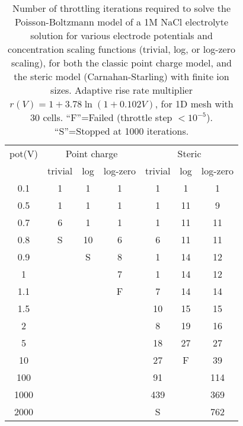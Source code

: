 \begin{table}
  \centering
  \begin{tabular}{c|ccc|ccc}
pot(V)  & \multicolumn{3}{c|}{Point charge} & \multicolumn{3}{c}{Steric}    \\
        & trivial & log & log-zero & trivial & log & log-zero \\ \hline
0.1	&1	&1	&1	&1	&1	&1\\
0.5	&1	&1	&1	&1	&11	&9\\
0.7	&6	&1	&1	&1	&11	&11\\
0.8	&S	&10	&6	&6	&11	&11\\
0.9	&	&S	&8	&1	&14	&12\\
1	&	&	&7	&1	&14	&12\\
1.1	&	&	&F	&7	&14	&14\\
1.5	&	&	&	&10	&15	&15\\
2	&	&	&	&8	&19	&16\\
5	&	&	&	&18	&27	&27\\
10	&	&	&	&27	&F	&39\\
100	&	&	&	&91	&	&114\\
1000	&	&	&	&439	&	&369    \\
2000	&	&	&	&S	&	&762    
  \end{tabular}
\caption{\label{tab:convergence}Number of throttling iterations
  required to  solve the Poisson-Boltzmann model of a 1M NaCl electrolyte solution
  for various electrode potentials and concentration scaling
  functions (trivial, log, or log-zero scaling), for both the classic point charge model, and the steric
  model (Carnahan-Starling) with finite ion sizes. Adaptive rise rate
  multiplier $r(V)=1+3.78\ln(1+0.102V)$, for 1D mesh with 30 cells. 
  ``F''=Failed
  (throttle step $<10^{-5}$). ``S''=Stopped at 1000 iterations.}
\end{table}


